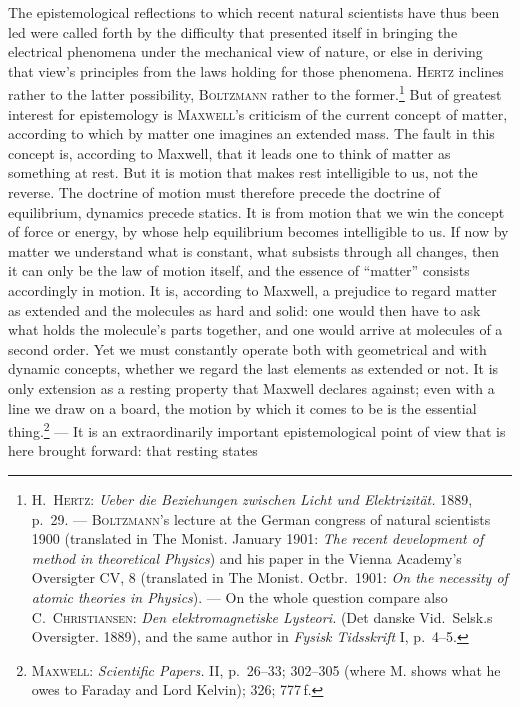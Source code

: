 \documentclass[12pt,a4paper]{book}
\newcommand{\opage}[1]{\marginnote{\footnotesize\textit{[#1]}}}
\begin{document}
The epistemological reflections to which recent natural scientists have thus
been led were called forth by the difficulty that presented itself in bringing
the electrical phenomena under the mechanical view of nature, or else in
deriving that view's principles from the laws holding for those phenomena.
\textsc{Hertz} inclines rather to the latter possibility, \textsc{Boltzmann}
rather to the former.\footnote{\textsc{\opage{88}H.~Hertz}: \textit{Ueber die Beziehungen
zwischen Licht und Elektrizität.} 1889, p.~29. --- \textsc{Boltzmann}'s lecture
at the German congress of natural scientists 1900 (translated in The Monist.
January 1901: \textit{The recent development of method in theoretical Physics})
and his paper in the Vienna Academy's Oversigter CV, 8 (translated in The
Monist. Octbr.\ 1901: \textit{On the necessity of atomic theories in Physics}).
--- On the whole question compare also \textsc{C.~Christiansen}: \textit{Den
elektromagnetiske Lysteori.} (Det danske Vid.~Selsk.s Oversigter. 1889), and the
same author in \textit{Fysisk Tidsskrift} I, p.~4--5.} But of greatest interest
for epistemology is \textsc{Maxwell}'s criticism of the current concept of
matter, according to which by matter one imagines an extended mass. The fault in
this concept is, according to Maxwell, that it leads one to think of matter as
something at rest. But it is motion that makes rest intelligible to us, not the
reverse. The doctrine of motion must therefore precede the doctrine of
equilibrium, dynamics precede statics. It is from motion that we win the concept
of force or energy, by whose help equilibrium becomes intelligible to us. If now
by matter we understand what is constant, what subsists through all changes,
then it can only be the law of motion itself, and the essence of ``matter''
consists accordingly in motion. It is, according to Maxwell, a prejudice to
regard matter as extended and the molecules as hard and solid: one would then
have to ask what holds the molecule's parts together, and \opage{42}one would arrive at
molecules of a second order. Yet we must constantly operate both with
geometrical and with dynamic concepts, whether we regard the last elements as
extended or not. It is only extension as a resting property that Maxwell
declares against; even with a line we draw on a board, the motion by which it
comes to be is the essential thing.\footnote{\textsc{Maxwell}: \textit{Scientific
Papers.} II, p.~26--33; 302--305 (where M. shows what he owes to Faraday and
Lord Kelvin); 326; 777\,f.} --- It is an extraordinarily important
epistemological point of view that is here brought forward: that resting states
\end{document}
